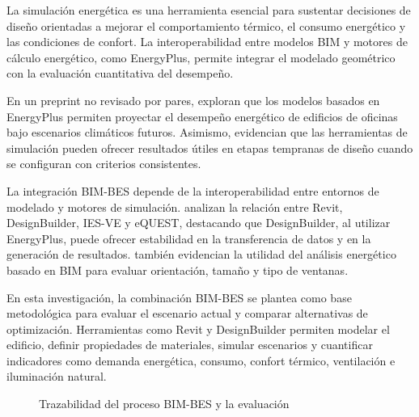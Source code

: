 \begin{textoDosTercios}

La simulación energética es una herramienta esencial para sustentar decisiones de diseño orientadas a mejorar el comportamiento térmico, el consumo energético y las condiciones de confort. La interoperabilidad entre modelos BIM y motores de cálculo energético, como EnergyPlus, permite integrar el modelado geométrico con la evaluación cuantitativa del desempeño.

En un preprint no revisado por pares, \textcite{nikniaSimulationBasedPredictionOffice2025} exploran que los modelos basados en EnergyPlus permiten proyectar el desempeño energético de edificios de oficinas bajo escenarios climáticos futuros. Asimismo, \textcite{delamagonzaloAssessmentBuildingEnergy2023} evidencian que las herramientas de simulación pueden ofrecer resultados útiles en etapas tempranas de diseño cuando se configuran con criterios consistentes.

La integración BIM-BES depende de la interoperabilidad entre entornos de modelado y motores de simulación. \textcite{vazBuildingInformationModeling2024} analizan la relación entre Revit, DesignBuilder, IES-VE y eQUEST, destacando que DesignBuilder, al utilizar EnergyPlus, puede ofrecer estabilidad en la transferencia de datos y en la generación de resultados. \textcite{jadhavBIMbasedEnergyConsumption2024} también evidencian la utilidad del análisis energético basado en BIM para evaluar orientación, tamaño y tipo de ventanas.

En esta investigación, la combinación BIM-BES se plantea como base metodológica para evaluar el escenario actual y comparar alternativas de optimización. Herramientas como Revit y DesignBuilder permiten modelar el edificio, definir propiedades de materiales, simular escenarios y cuantificar indicadores como demanda energética, consumo, confort térmico, ventilación e iluminación natural.

\end{textoDosTercios}


\begin{figure}[htbp]\centering
{}
\caption{Trazabilidad del proceso BIM-BES y la evaluación}
\end{figure}

